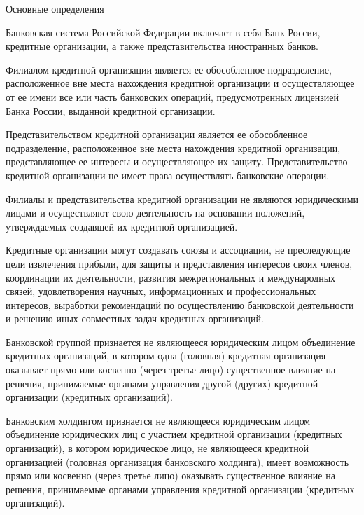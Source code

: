 \documentclass[_Banking_p1.tex]{subfiles}
\begin{document}
\begin{frame}[allowframebreaks]{Основные определения}{}
\begin{block}{Банковская система Российской Федерации}
\quad
включает в себя Банк России, кредитные организации, а также представительства иностранных банков.

\end{block}
\pagebreak
\begin{block}{Филиалом кредитной организации}
\quad
 является ее обособленное подразделение, расположенное вне места нахождения кредитной организации и осуществляющее от ее имени все или часть банковских операций, предусмотренных лицензией Банка России, выданной кредитной организации.
\end{block}

\pagebreak
\begin{block}{Представительством кредитной организации}
\quad
 является ее обособленное подразделение, расположенное вне места нахождения кредитной организации, представляющее ее интересы и осуществляющее их защиту. Представительство кредитной организации не имеет права осуществлять банковские операции.
\end{block}

\pagebreak
Филиалы и представительства кредитной организации не являются юридическими лицами и осуществляют свою деятельность на основании положений, утверждаемых создавшей их кредитной организацией.

\pagebreak
Кредитные организации могут создавать союзы и ассоциации, не преследующие цели извлечения прибыли, для защиты и представления интересов своих членов, координации их деятельности, развития межрегиональных и международных связей, удовлетворения научных, информационных и профессиональных интересов, выработки рекомендаций по осуществлению банковской деятельности и решению иных совместных задач кредитных организаций.

\pagebreak
\begin{block}{Банковской группой}
\quad
 признается не являющееся юридическим лицом объединение кредитных организаций, в котором одна (головная) кредитная организация оказывает прямо или косвенно (через третье лицо) существенное влияние на решения, принимаемые органами управления другой (других) кредитной организации (кредитных организаций).
\end{block}
\pagebreak
\begin{block}{Банковским холдингом}
\quad
 признается не являющееся юридическим лицом объединение юридических лиц с участием кредитной организации (кредитных организаций), в котором юридическое лицо, не являющееся кредитной организацией (головная организация банковского холдинга), имеет возможность прямо или косвенно (через третье лицо) оказывать существенное влияние на решения, принимаемые органами управления кредитной организации (кредитных организаций).
\end{block}

\end{frame}
\end{document}
